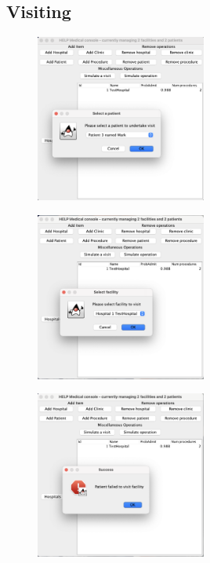 \documentclass{article}
\begin{document}
\subsection{Visiting}\label{sub:visiting} %
\begin{figure}
  \begin{center}
    \includegraphics[width=0.5\textwidth]{./figures/Visit/Visit_1.png}
  \end{center}
\end{figure}

\begin{figure}
  \begin{center}
    \includegraphics[width=0.5\textwidth]{./figures/Visit/Visit_2.png}
  \end{center}
\end{figure}

\begin{figure}
  \begin{center}
    \includegraphics[width=0.5\textwidth]{./figures/Visit/Visit_3.png}
  \end{center}
\end{figure}
\end{document}
